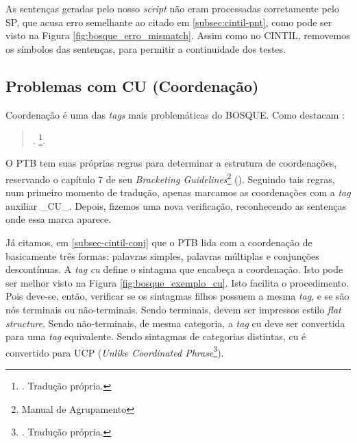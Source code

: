 As sentenças geradas pelo nosso \textit{script} não eram processadas corretamente pelo SP, que acusa erro semelhante ao citado em \ref{subsec:cintil-pnt}, como pode ser visto na Figura \ref{fig:bosque_erro_mismatch}. Assim como no CINTIL, removemos os símbolos das sentenças, para permitir a continuidade dos testes.
\begin{center}
    
\end{center}
\subsection{Problemas com CU (Coordenação)}
\label{subsec:cu}
Coordenação é uma das \textit{tags} mais problemáticas do BOSQUE. Como destacam :
\begin{quote}
    .
    \footnote{. Tradução própria.}.
\end{quote}
O PTB tem suas próprias regras para determinar a estrutura de coordenações, reservando o capítulo 7 de seu \textit{Bracketing Guidelines}\footnote{Manual de Agrupamento} (). Seguindo tais regras, num primeiro momento de tradução, apenas marcamos as coordenações com a \textit{tag} auxiliar \_CU\_. Depois, fizemos uma nova verificação, reconhecendo as sentenças onde essa marca aparece.
\begin{center}
    
\end{center}
Já citamos, em \ref{subsec-cintil-conj} que o PTB lida com a coordenação de basicamente três formas: palavras simples, palavras múltiplas e conjunções descontínuas. A \textit{tag} \textit{cu} define o sintagma que encabeça a coordenação. Isto pode ser melhor visto na Figura \ref{fig:bosque_exemplo_cu}. Isto facilita o procedimento. Pois deve-se, então, verificar se os sintagmas filhos possuem a mesma \textit{tag}, e se são nós terminais ou não-terminais. Sendo terminais, devem ser impressos estilo \textit{flat structure}. Sendo não-terminais, de mesma categoria, a \textit{tag} cu deve ser convertida para uma \textit{tag} equivalente. Sendo sintagmas de categorias distintas, cu é convertido para UCP (\textit{Unlike Coordinated Phrase}\footnote{. Tradução própria.}).
